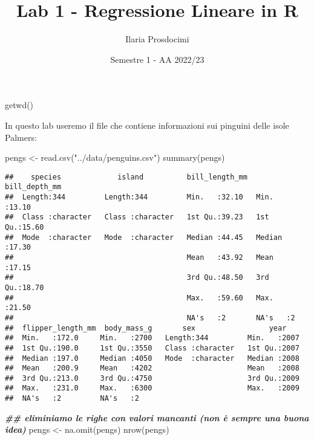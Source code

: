 \documentclass[
]{article}
\title{Lab 1 - Regressione Lineare in R}
\author{Ilaria Prosdocimi}
\date{Semestre 1 - AA 2022/23}
\newenvironment{Shaded}{\begin{snugshade}}{\end{snugshade}}
\newcommand{\DocumentationTok}[1]{\textcolor[rgb]{0.56,0.35,0.01}{\textbf{\textit{#1}}}}
\newcommand{\FunctionTok}[1]{\textcolor[rgb]{0.00,0.00,0.00}{#1}}
\newcommand{\NormalTok}[1]{#1}
\newcommand{\OtherTok}[1]{\textcolor[rgb]{0.56,0.35,0.01}{#1}}
\newcommand{\StringTok}[1]{\textcolor[rgb]{0.31,0.60,0.02}{#1}}
\begin{document}
\maketitle

{
\setcounter{tocdepth}{2}
\tableofcontents
}
\begin{Shaded}
\begin{Highlighting}[]
\NormalTok{getwd()}
\end{Highlighting}
\end{Shaded}

In questo lab useremo il file che contiene informazioni sui pinguini
delle isole Palmers:

\begin{Shaded}
\begin{Highlighting}[]
\NormalTok{pengs }\OtherTok{\textless{}{-}} \FunctionTok{read.csv}\NormalTok{(}\StringTok{"../data/penguins.csv"}\NormalTok{)}
\FunctionTok{summary}\NormalTok{(pengs)}
\end{Highlighting}
\end{Shaded}

\begin{verbatim}
##    species             island          bill_length_mm  bill_depth_mm  
##  Length:344         Length:344         Min.   :32.10   Min.   :13.10  
##  Class :character   Class :character   1st Qu.:39.23   1st Qu.:15.60  
##  Mode  :character   Mode  :character   Median :44.45   Median :17.30  
##                                        Mean   :43.92   Mean   :17.15  
##                                        3rd Qu.:48.50   3rd Qu.:18.70  
##                                        Max.   :59.60   Max.   :21.50  
##                                        NA's   :2       NA's   :2      
##  flipper_length_mm  body_mass_g       sex                 year     
##  Min.   :172.0     Min.   :2700   Length:344         Min.   :2007  
##  1st Qu.:190.0     1st Qu.:3550   Class :character   1st Qu.:2007  
##  Median :197.0     Median :4050   Mode  :character   Median :2008  
##  Mean   :200.9     Mean   :4202                      Mean   :2008  
##  3rd Qu.:213.0     3rd Qu.:4750                      3rd Qu.:2009  
##  Max.   :231.0     Max.   :6300                      Max.   :2009  
##  NA's   :2         NA's   :2
\end{verbatim}

\begin{Shaded}
\begin{Highlighting}[]
\DocumentationTok{\#\# eliminiamo le righe con valori mancanti (non è sempre una buona idea) }
\NormalTok{pengs }\OtherTok{\textless{}{-}} \FunctionTok{na.omit}\NormalTok{(pengs)}
\FunctionTok{nrow}\NormalTok{(pengs)}
\end{Highlighting}
\end{Shaded}
\end{document}
